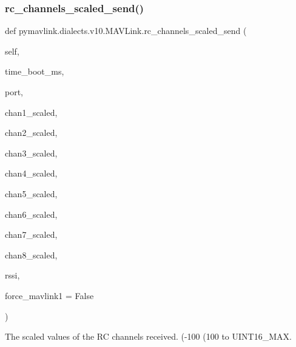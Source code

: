 \begin{DoxyVerb}
\begin{DoxyVerb}
\begin{DoxyVerb}
\begin{DoxyVerb}
\begin{DoxyVerb}
\begin{DoxyVerb}
\begin{DoxyVerb}
\begin{DoxyVerb}
\subsubsection{\texorpdfstring{rc\+\_\+channels\+\_\+scaled\+\_\+send()}{rc\_channels\_scaled\_send()}}
{\footnotesize\ttfamily def pymavlink.\+dialects.\+v10.\+M\+A\+V\+Link.\+rc\+\_\+channels\+\_\+scaled\+\_\+send (\begin{DoxyParamCaption}\item[{}]{self,  }\item[{}]{time\+\_\+boot\+\_\+ms,  }\item[{}]{port,  }\item[{}]{chan1\+\_\+scaled,  }\item[{}]{chan2\+\_\+scaled,  }\item[{}]{chan3\+\_\+scaled,  }\item[{}]{chan4\+\_\+scaled,  }\item[{}]{chan5\+\_\+scaled,  }\item[{}]{chan6\+\_\+scaled,  }\item[{}]{chan7\+\_\+scaled,  }\item[{}]{chan8\+\_\+scaled,  }\item[{}]{rssi,  }\item[{}]{force\+\_\+mavlink1 = {\ttfamily False} }\end{DoxyParamCaption})}

\begin{DoxyVerb}The scaled values of the RC channels received. (-100%
(100%
to UINT16_MAX.


\end{DoxyVerb}
\end{DoxyVerb}
\end{DoxyVerb}
\end{DoxyVerb}
\end{DoxyVerb}
\end{DoxyVerb}
\end{DoxyVerb}
\end{DoxyVerb}
\end{DoxyVerb}
